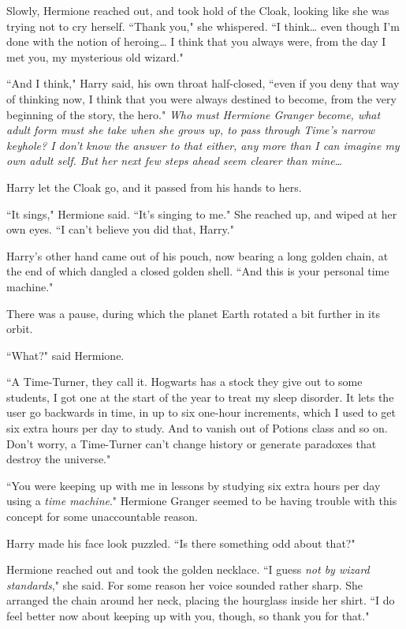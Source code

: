 Slowly, Hermione reached out, and took hold of the Cloak, looking like she was trying not to cry herself. ``Thank you," she whispered. ``I think{\ldots} even though I'm done with the notion of heroing{\ldots} I think that you always were, from the day I met you, my mysterious old wizard."

``And I think," Harry said, his own throat half-closed, ``even if you deny that way of thinking now, I think that you were always destined to become, from the very beginning of the story, the hero." \emph{Who must Hermione Granger become, what adult form must she take when she grows up, to pass through Time's narrow keyhole? I don't know the answer to that either, any more than I can imagine my own adult self. But her next few steps ahead seem clearer than mine{\ldots}}

Harry let the Cloak go, and it passed from his hands to hers.

``It sings," Hermione said. ``It's singing to me." She reached up, and wiped at her own eyes. ``I can't believe you did that, Harry."

Harry's other hand came out of his pouch, now bearing a long golden chain, at the end of which dangled a closed golden shell. ``And this is your personal time machine."

There was a pause, during which the planet Earth rotated a bit further in its orbit.

``What?" said Hermione.

``A Time-Turner, they call it. Hogwarts has a stock they give out to some students, I got one at the start of the year to treat my sleep disorder. It lets the user go backwards in time, in up to six one-hour increments, which I used to get six extra hours per day to study. And to vanish out of Potions class and so on. Don't worry, a Time-Turner can't change history or generate paradoxes that destroy the universe."

``You were keeping up with me in lessons by studying six extra hours per day using a \emph{time machine}." Hermione Granger seemed to be having trouble with this concept for some unaccountable reason.

Harry made his face look puzzled. ``Is there something odd about that?"

Hermione reached out and took the golden necklace. ``I guess \emph{not by wizard standards}," she said. For some reason her voice sounded rather sharp. She arranged the chain around her neck, placing the hourglass inside her shirt. ``I do feel better now about keeping up with you, though, so thank you for that."

